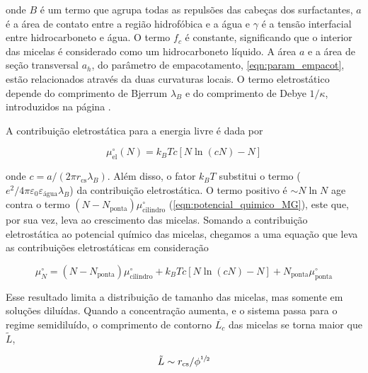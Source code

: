 		\noindent onde \(B\) é um termo que agrupa todas as repulsões das cabeças dos surfactantes, \(a\) é a área de contato entre a região hidrofóbica e a água e \(\gamma\) é a tensão interfacial entre hidrocarboneto e água. O termo \(f_c\) é constante, significando que o interior das micelas é considerado como um hidrocarboneto líquido. A área \(a\) e a área de seção transversal \(a_h\), do parâmetro de empacotamento, \autoref{eqn:param_empacot}, estão relacionados através da duas curvaturas locais. O termo eletrostático depende do comprimento de Bjerrum \(\lambda_B\) e do comprimento de Debye \(1/\kappa\), introduzidos na página \pageref{eqn:comprimento_debye}.
		
		A contribuição eletrostática para a energia livre é dada por \cite{Giant_Micelles}
		
		\begin{equation}
			\mu_\mathrm{el}^\circ (N) = k_B T c \left[ N \ln (cN) - N \right]
			\label{eqn:potencial_quim_eletrostatico}
		\end{equation} 
		
		\noindent onde \(c = a / (2 \pi r_\mathrm{cs} \lambda_B)\). Além disso, o fator \(k_BT\) substitui o termo (\(e^2/4\pi\varepsilon_{ 0 }\varepsilon_\mathrm{água}\lambda_B\)) da contribuição eletrostática. O termo positivo é \(\sim N \ln N\) age contra o termo \((N - N_\mathrm{ponta}) \mu_\mathrm{cilindro}^\circ\) (\autoref{eqn:potencial_quimico_MG}), este que, por sua vez, leva ao crescimento das micelas. Somando a contribuição eletrostática ao potencial químico das micelas, chegamos a uma equação que leva as contribuições eletrostáticas em consideração \cite{Giant_Micelles}
		
		\begin{equation}
			\mu_N^\circ = (N - N_\mathrm{ponta})\mu_\mathrm{cilindro}^\circ + k_B T c \left[ N \ln (cN) - N \right] + N_\mathrm{ponta}\mu_\mathrm{ponta}^\circ
		\end{equation}
		
		Esse resultado limita a distribuição de tamanho das micelas, mas somente em soluções diluídas. Quando a concentração aumenta, e o sistema passa para o regime semidiluído, o comprimento de contorno \(\overline{L_c}\) das micelas se torna maior que \(\tilde{L}\), 
		
		\begin{equation}
		 	\tilde{L} \sim r_\mathrm{cs} / \phi^{\sfrac{1}{2}}
		\end{equation}
		
